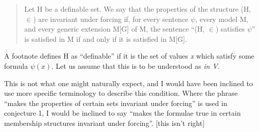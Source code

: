 \begin{quote}
Let H be a definable set.
We say that the properties of the structure (H, $\in$) are invariant under forcing if, for every sentence $\psi$, every model M, and every generic extension M[G] of M, the sentence ``(H, $\in$) satisfies $\psi$'' is satisfied in M if and only if it is satisfied in M[G].
\end{quote}

A footnote defines H as ``definable'' if it is the set of values \emph{x} which satisfy some formula $\psi(x)$. 
Let us assume that this is to be understood as \emph{in V}.

This is not what one might naturally expect, and I would have been inclined to use more specific terminology to describe this condition.
Where the phrase ``makes the properties of certain sets invariant under forcing'' is used in conjecture 1, I would be inclined to say ``makes the formulae true in certain membership structures invariant under forcing''. 
[this isn't right]


